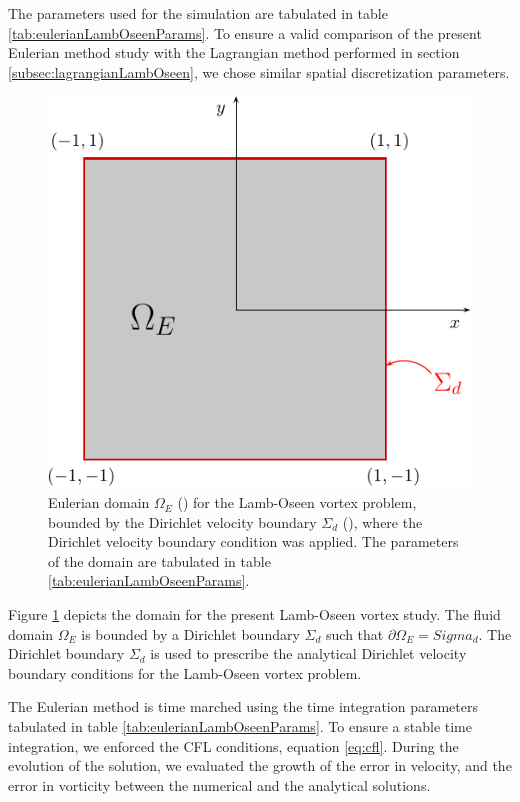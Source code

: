 The parameters used for the simulation are tabulated in table \ref{tab:eulerianLambOseenParams}. To ensure a valid comparison of the present Eulerian method study with the Lagrangian method performed in section \ref{subsec:lagrangianLambOseen}, we chose similar spatial discretization parameters.

	\begin{figure}[!t]
	\centering
	\includegraphics[width=0.5\linewidth]{./figures/eulerian/lambOseenDomainDefinition-crop.pdf}
	\caption{Eulerian domain $\Omega_E$ ({}) for the Lamb-Oseen vortex problem, bounded by the Dirichlet velocity boundary $\Sigma_d$ ({}), where the Dirichlet velocity boundary condition was applied. The parameters of the domain are tabulated in table \ref{tab:eulerianLambOseenParams}.}
	\label{fig:lambOseenDomainDefinition}
	\end{figure}

Figure \ref{fig:lambOseenDomainDefinition} depicts the domain for the present Lamb-Oseen vortex study. The fluid domain $\Omega_E$ is bounded by a Dirichlet boundary $\Sigma_d$ such that $\partial \Omega_E = Sigma_d$. The Dirichlet boundary $\Sigma_d$ is used to prescribe the analytical Dirichlet velocity boundary conditions for the Lamb-Oseen vortex problem.
 
The Eulerian method is time marched using the time integration parameters tabulated in table \ref{tab:eulerianLambOseenParams}. To ensure a stable time integration, we enforced the CFL conditions, equation \ref{eq:cfl}. During the evolution of the solution, we evaluated the growth of the error in velocity, and the error in vorticity between the numerical and the analytical solutions.




